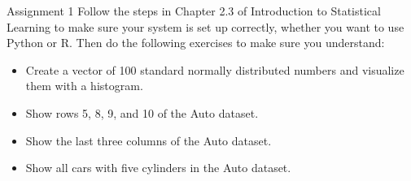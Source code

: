 \begin{frame}{Assignment 1}
    Follow the steps in Chapter 2.3 of Introduction to Statistical Learning to make sure your system is set up correctly, whether you want to use Python or R. Then do the following exercises to make sure you understand:

    \begin{itemize}
        \item Create a vector of 100 standard normally distributed numbers and visualize them with a histogram.
        \item Show rows 5, 8, 9, and 10 of the Auto dataset.
        \item Show the last three columns of the Auto dataset.
        \item Show all cars with five cylinders in the Auto dataset.
    \end{itemize}
\end{frame}

